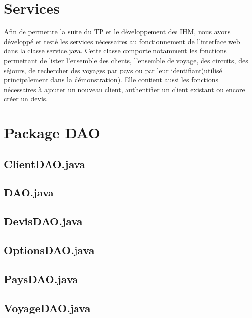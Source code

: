\documentclass[11pt]{article}
\begin{document}
\section{Services}
Afin de permettre la suite du TP et le développement des IHM, nous avons développé et testé les services nécessaires au fonctionnement de l'interface web dans la classe service.java. Cette classe comporte notamment les fonctions permettant de lister l'ensemble des clients, l'ensemble de voyage, des circuits, des séjours, de rechercher des voyages par pays ou par leur identifiant(utilisé principalement dans la démonstration).  Elle contient aussi les fonctions nécessaires à ajouter un nouveau client, authentifier un client existant ou encore créer un devis. 

\newpage
\appendix
\section{Package DAO}

\subsection*{ClientDAO.java}

\newpage

\subsection*{DAO.java}

\newpage

\subsection*{DevisDAO.java}

\newpage

\subsection*{OptionsDAO.java}

\newpage

\subsection*{PaysDAO.java}

\newpage

\subsection*{VoyageDAO.java}

\newpage
\end{document}
